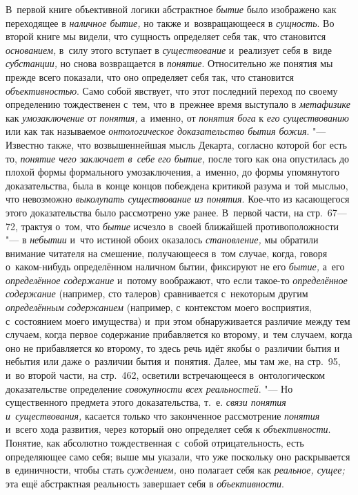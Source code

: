 В~первой книге объективной логики абстрактное {\em бытие} было
изображено как переходящее в {\em наличное бытие,} но
также и~возвращающееся в {\em сущность}. Во второй
книге мы видели, что сущность определяет себя так, что становится
{\em основанием,} в~силу этого вступает в {\em существование}
и~реализует себя в~виде {\em субстанции,} но
снова возвращается в {\em понятие}.
Относительно же понятия мы прежде всего показали, что оно
определяет себя так, что становится {\em объективностью}.
Само собой явствует, что этот последний переход по своему
определению тождественен с~тем, что в~прежнее время выступало в
{\em метафизике} как {\em умозаключение} от {\em понятия,} а~именно,
от {\em понятия бога} к {\em его существованию} или как так называемое
{\em онтологическое доказательство бытия
божия}. "--- Известно также, что возвышеннейшая мысль Декарта,
согласно которой бог есть то, {\em понятие чего заключает в~себе его
бытие,} после того как она опустилась до плохой формы
формального умозаключения, а~именно, до формы упомянутого доказательства,
была в~конце концов побеждена критикой разума и~той мыслью, что невозможно
{\em выколупать существование из
понятия}. Кое-что из касающегося этого доказательства было
рассмотрено уже ранее. В~первой части, на стр.~67---72, трактуя о~том, что
{\em бытие} исчезло в~своей ближайшей противоположности "--- в
{\em небытии} и~что истиной обоих оказалось {\em становление,} мы
обратили внимание читателя на смешение, получающееся в~том случае, когда,
говоря о~каком-нибудь определённом наличном бытии, фиксируют не его
{\em бытие,} а~его {\em определённое содержание}
и~потому воображают, что если такое-то {\em определённое содержание}
(например, сто талеров) сравнивается с~некоторым другим
{\em определённым содержанием}
(например, с~контекстом моего восприятия, с~состоянием моего
имущества) и~при этом обнаруживается различие между тем случаем, когда
первое содержание прибавляется ко второму, и~тем случаем, когда оно не
прибавляется ко второму, то здесь речь идёт якобы о~различии бытия и
небытия или даже о~различии бытия и~понятия. Далее, мы там же, на стр.~95,
и~во второй части, на стр.~462, осветили встречающееся в~онтологическом
доказательстве определение {\em совокупности всех реальностей}. "---
Но существенного предмета этого доказательства, т.~е.
{\em связи понятия и~существования,}
касается только что законченное рассмотрение {\em понятия} и~всего
хода развития, через который оно определяет себя к {\em объективности}.
Понятие, как абсолютно тождественная с~собой отрицательность,
есть определяющее само себя; выше мы указали, что уже поскольку оно
раскрывается в~единичности, чтобы стать {\em суждением,} оно
полагает себя как {\em реальное, сущее;} эта ещё
абстрактная реальность завершает себя в {\em объективности}.

